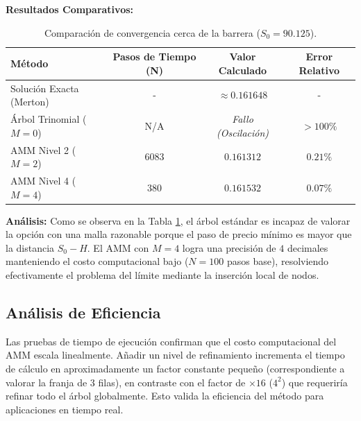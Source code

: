 \textbf{Resultados Comparativos:}

\begin{table}[h] \centering 
  \begin{tabular}{|l|c|c|c|} 
    \hline \textbf{Método} & \textbf{Pasos de Tiempo (N)} & \textbf{Valor Calculado} & \textbf{Error Relativo} \\ 
    \hline Solución Exacta (Merton) & - & \textbf{$\approx 0.161648$} & - \\ 
    \hline Árbol Trinomial ($M=0$) & N/A & \textit{Fallo (Oscilación)} & $>100\%$ \\ 
    \hline AMM Nivel 2 ($M=2$) & $6083$ & $0.161312$ & $0.21\%$ \\ 
    \hline AMM Nivel 4 ($M=4$) & $380$ & \textbf{$0.161532$} & $0.07\%$ \\ 
    \hline 
  \end{tabular} \caption{Comparación de convergencia cerca de la barrera ($S_0=90.125$).} \label{tab:amm_results} 
\end{table}

\textbf{Análisis:} Como se observa en la Tabla \ref{tab:amm_results}, el árbol estándar es incapaz de valorar la opción con una malla razonable porque el paso de precio mínimo es mayor que la distancia $S_0-H$. El AMM con $M=4$ logra una precisión de $4$ decimales manteniendo el costo computacional bajo ($N=100$ pasos base), resolviendo efectivamente el problema del límite mediante la inserción local de nodos.

\subsection{Análisis de Eficiencia} 

Las pruebas de tiempo de ejecución confirman que el costo computacional del AMM escala linealmente. Añadir un nivel de refinamiento incrementa el tiempo de cálculo en aproximadamente un factor constante pequeño (correspondiente a valorar la franja de 3 filas), en contraste con el factor de $\times16$ ($4^2$) que requeriría refinar todo el árbol globalmente. Esto valida la eficiencia del método para aplicaciones en tiempo real.
